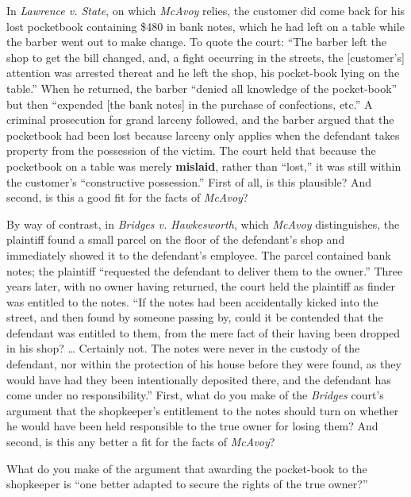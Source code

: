 
\item In \textit{Lawrence v. State}, on which \textit{McAvoy} relies, the
customer did come back for his lost pocketbook containing \$480 in bank notes,
which he had left on a table while the barber went out to make change. To quote
the court: ``The barber left the shop to get the bill changed, and, a fight
occurring in the streets, the [customer's] attention was arrested thereat and
he left the shop, his pocket-book lying on the table.'' When he returned, the
barber ``denied all knowledge of the pocket-book'' but then ``expended [the
bank notes] in the purchase of confections, etc.'' A criminal prosecution for
grand larceny followed, and the barber argued that the pocketbook had been lost
because larceny only applies when the defendant takes property from the
possession of the victim. The court held that because the pocketbook on a table
was merely \textbf{mislaid}, rather than ``lost,'' it was still within the
customer's ``constructive possession.'' First of all, is this plausible? And
second, is this a good fit for the facts of \textit{McAvoy}?


\item By way of contrast, in \textit{Bridges v. Hawkesworth}, which
\textit{McAvoy} distinguishes, the plaintiff found a small parcel on the floor
of the defendant's shop and immediately showed it to the defendant's employee.
The parcel contained bank notes; the plaintiff ``requested the defendant to
deliver them to the owner.'' Three years later, with no owner having returned,
the court held the plaintiff as finder was entitled to the notes. ``If the
notes had been accidentally kicked into the street, and then found by someone
passing by, could it be contended that the defendant was entitled to them, from
the mere fact of their having been dropped in his shop? \dots{} Certainly not.
The notes were never in the custody of the defendant, nor within the protection
of his house before they were found, as they would have had they been
intentionally deposited there, and the defendant has come under no
responsibility.'' First, what do you make of the \textit{Bridges} court's
argument that the shopkeeper's entitlement to the notes should turn on whether
he would have been held responsible to the true owner for losing them? And
second, is this any better a fit for the facts of \textit{McAvoy}?


\item What do you make of the argument that awarding the pocket-book to the
shopkeeper is ``one better adapted to secure the rights of the true owner?''


